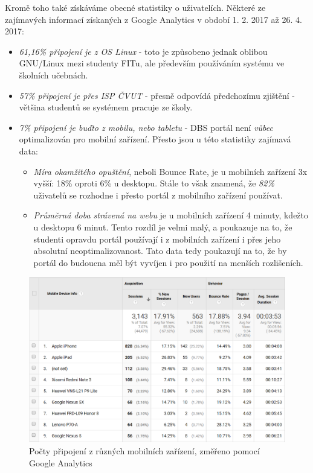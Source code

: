 Kromě toho také získáváme obecné statistiky o uživatelích. Některé ze zajímavých informací získaných z Google Analytics v období 1. 2. 2017 až 26. 4. 2017:
\begin{itemize}
	\item \emph{61,16\% připojení je z OS Linux} - toto je způsobeno jednak oblibou GNU/Linux mezi studenty FITu, ale především používáním systému ve školních učebnách.
	\item \emph{57\% připojení je přes ISP ČVUT} - přesně odpovídá předchozímu zjištění - většina studentů se systémem pracuje ze školy.
	\item \emph{7\% připojení je buďto z mobilu, nebo tabletu} - DBS portál není \emph{vůbec} optimalizován pro mobilní zařízení. Přesto jsou u této statistiky zajímavá data:
	\begin{itemize}
		\item \emph{Míra okamžitého opuštění}, neboli Bounce Rate, je u mobilních zařízení 3x vyšší: 18\% oproti 6\% u desktopu. Stále to však znamená, že \emph{82\%} uživatelů se rozhodne i přesto portál z mobilního zařízení používat.
		\item \emph{Průměrná doba strávená na webu} je u mobilních zařízení 4 minuty, kdežto u desktopu 6 minut. Tento rozdíl je velmi malý, a poukazuje na to, že studenti opravdu portál používají i z mobilních zařízení i přes jeho absolutní neoptimalizovanost. Tato data tedy poukazují na to, že by portál do budoucna měl být vyvíjen i pro použití na menších rozlišeních.
	\end{itemize}
\end{itemize}
\begin{figure}[H]
\includegraphics[width=\textwidth]{../png/analytics-mobile.png}
\caption{Počty připojení z různých mobilních zařízení, změřeno pomocí Google Analytics} \label{picture:analytics-mobile}
\end{figure}

